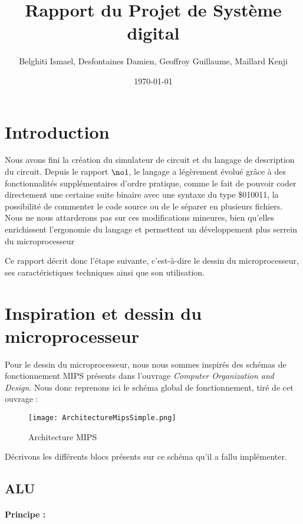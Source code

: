 \documentclass[13pt]{article}
\title{Rapport du Projet de Système digital \no2}
\author{Belghiti Ismael, Desfontaines Damien, Geoffroy Guillaume, Maillard Kenji}
\date{\today}
\begin{document}
\renewcommand{\labelitemi}{$\triangleright$}
\maketitle

\section{Introduction}

Nous avons fini la création du simulateur de circuit et du langage
de description du circuit. Depuis le rapport $\no1$,
le langage a légèrement évolué grâce à des fonctionnalités supplémentaires
d'ordre pratique, comme le fait de pouvoir coder directement une certaine
suite binaire avec une syntaxe du type \$010011, la possibilité de
commenter le code source ou de le séparer en plusieurs fichiers. Nous
ne nous attarderons pas sur ces modifications mineures, bien qu'elles
enrichissent l'ergonomie du langage et permettent un développement plus serrein 
du microprocesseur

Ce rapport décrit donc l'étape suivante, c'est-à-dire le dessin du
microprocesseur, ses caractéristiques techniques ainsi que son utilisation.

\section{Inspiration et dessin du microprocesseur}

Pour le dessin du microprocesseur, nous nous sommes inspirés des schémas
de fonctionnement MIPS présents dans l'ouvrage \textit{Computer Organization and Design}.
Nous donc reprenons ici le schéma global de fonctionnement, tiré de
cet ouvrage :

\begin{figure}[!h]
\centering
\texttt{[image: ArchitectureMipsSimple.png]}
\caption{Architecture MIPS}
\label{Architecture MIPS}
\end{figure}


Décrivons les différents blocs présents sur ce schéma qu'il a fallu
implémenter. 

\subsection{ALU}


\paragraph*{Principe :}
\end{document}
